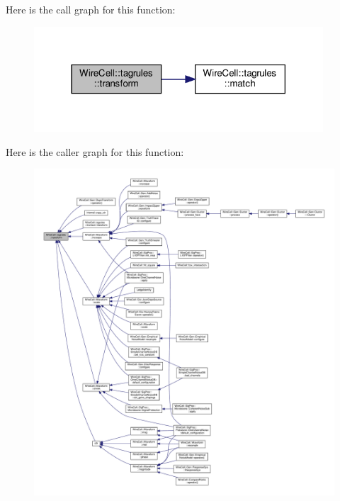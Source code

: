 Here is the call graph for this function\+:
\nopagebreak
\begin{figure}[H]
\begin{center}
\leavevmode
\includegraphics[width=306pt]{namespace_wire_cell_1_1tagrules_a8e7dac6e5d8aa67bbe4c801a1738d170_cgraph}
\end{center}
\end{figure}
Here is the caller graph for this function\+:
\nopagebreak
\begin{figure}[H]
\begin{center}
\leavevmode
\includegraphics[width=350pt]{namespace_wire_cell_1_1tagrules_a8e7dac6e5d8aa67bbe4c801a1738d170_icgraph}
\end{center}
\end{figure}
